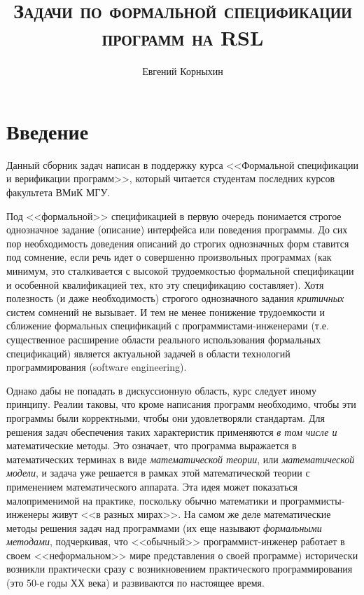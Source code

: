 \documentclass[14pt, twoside]{extreport}
\author{Евгений Корныхин}
\title{\huge{\textbf{\textsc{Задачи по формальной спецификации программ на RSL}}}}
\begin{document}
\maketitle

\tableofcontents

\chapter*{Введение}

Данный сборник задач написан в поддержку курса <<Формальной спецификации и верификации программ>>, который читается студентам последних курсов факультета ВМиК МГУ.

Под <<формальной>> спецификацией в первую очередь понимается строгое однозначное задание (описание) интерфейса или поведения программы. До сих пор необходимость доведения описаний до строгих однозначных форм ставится под сомнение, если речь идет о совершенно произвольных программах (как минимум, это сталкивается с высокой трудоемкостью формальной спецификации и особенной квалификацией тех, кто эту спецификацию составляет). Хотя полезность (и даже необходимость) строгого однозначного задания \emph{критичных} систем сомнений не вызывает. И тем не менее понижение трудоемкости и сближение формальных спецификаций с программистами-инженерами (т.е. существенное расширение области реального использования формальных спецификаций) является актуальной задачей в области технологий программирования (software engineering).

Однако дабы не попадать в дискуссионную область, курс следует иному принципу. Реалии таковы, что кроме написания программ необходимо, чтобы эти программы были корректными, чтобы они удовлетворяли стандартам. Для решения задач обеспечения таких характеристик применяются \emph{в том числе и} математические методы. Это означает, что программа выражается в математических терминах в виде \emph{математической теории}, или \emph{математической модели}, и задача уже решается в рамках этой математической теории с применением математического аппарата. Эта идея может показаться малоприменимой на практике, поскольку обычно математики и программисты-инженеры живут <<в разных мирах>>. На самом же деле математические методы решения задач над программами (их еще называют \emph{формальными методами}, подчеркивая, что <<обычный>> программист-инженер работает в своем <<неформальном>> мире представления о своей программе) исторически возникли практически сразу с возникновением практического программирования (это 50-е годы ХХ века) и развиваются по настоящее время.
\end{document}
